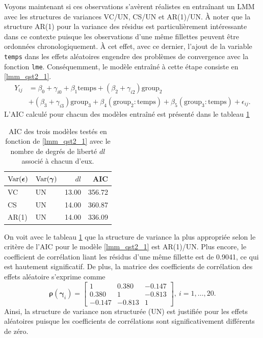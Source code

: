 \documentclass{article}
\begin{document}
		Voyons maintenant si ces observations s'avèrent réalistes en entraînant un LMM avec les structures de variances VC/UN, CS/UN et AR(1)/UN. À noter que la structure AR(1) pour la variance des résidus est particulièrement intéressante dans ce contexte puisque les observations d'une même fillettes peuvent être ordonnées chronologiquement.
		À cet effet, avec ce dernier, l'ajout de la variable \texttt{temps} dans les effets aléatoires engendre des problèmes de convergence avec la fonction \texttt{lme}. Conséquemment, le modèle entraîné à cette étape consiste en \eqref{lmm_qst2_1}.
		\begin{align}\label{lmm_qst2_1}
			Y_{ij} &= \beta_0 + \gamma_{i0} + \beta_1 \mathrm{temps} + (\beta_2 + \gamma_{i2}) \mathrm{group_2} \\
			&+ (\beta_3 + \gamma_{i3}) \mathrm{group_3} + \beta_4 (\mathrm{group_2:temps}) + \beta_5 (\mathrm{group_3:temps}) + \epsilon_{ij}. \nonumber
		\end{align}
		L'AIC calculé pour chacun des modèles entraîné est présenté dans le tableau \ref{tbl_AIC_Qst2}
		\begin{table}[H]
			\centering
			\begin{tabular}{ll|rr}
				\hline
				$\mathrm{Var}(\boldsymbol{\epsilon})$ & $\mathrm{Var}(\boldsymbol{\gamma})$ & $dl$ & AIC \\ 
				\hline
				VC & UN & 13.00 & 356.72 \\ 
				CS & UN & 14.00 & 360.87 \\ 
				AR(1) & UN & 14.00 & 336.09 \\ 
				\hline
			\end{tabular}
			\caption{AIC des trois modèles testés en fonction de \eqref{lmm_qst2_1} avec le nombre de degrés de liberté $dl$ associé à chacun d'eux.}
			\label{tbl_AIC_Qst2}
		\end{table}
	On voit avec le tableau \ref{tbl_AIC_Qst2} que la structure de variance la plus appropriée selon le critère de l'AIC pour le modèle \eqref{lmm_qst2_1} est AR(1)/UN. Plus encore, le coefficient de corrélation liant les résidus d'une même fillette est de 0.9041, ce qui est hautement significatif. De plus, la matrice des coefficients de corrélation des effets aléatoire s'exprime comme
	$$
		\boldsymbol{\rho}(\boldsymbol{\gamma}_i) = 
		\begin{bmatrix}
			1 & 0.380 & -0.147 \\
			0.380 & 1 & -0.813 \\
			-0.147 & -0.813 & 1
		\end{bmatrix},\ i=1,\dots, 20.
	$$
	Ainsi, la structure de variance non structurée (UN) est justifiée pour les effets aléatoires puisque les coefficients de corrélations sont significativement différents de zéro.\\
	
\end{document}
